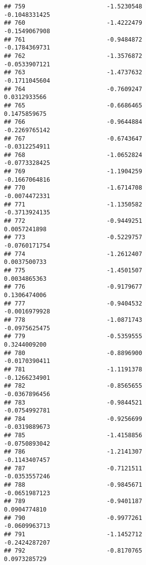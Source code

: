 \documentclass[
]{article}
\begin{document}
\begin{verbatim}
## 759                       -1.5230548                         -0.1048331425
## 760                       -1.4222479                         -0.1549067908
## 761                       -0.9484872                         -0.1784369731
## 762                       -1.3576872                         -0.0533907121
## 763                       -1.4737632                         -0.1711045604
## 764                       -0.7609247                          0.0312933566
## 765                       -0.6686465                          0.1475859675
## 766                       -0.9644884                         -0.2269765142
## 767                       -0.6743647                         -0.0312254911
## 768                       -1.0652824                         -0.0773328425
## 769                       -1.1904259                         -0.1667064816
## 770                       -1.6714708                         -0.0074472331
## 771                       -1.1350582                         -0.3713924135
## 772                       -0.9449251                          0.0057241898
## 773                       -0.5229757                         -0.0760171754
## 774                       -1.2612407                          0.0037500733
## 775                       -1.4501507                          0.0034865363
## 776                       -0.9179677                          0.1306474006
## 777                       -0.9404532                         -0.0016979928
## 778                       -1.0871743                         -0.0975625475
## 779                       -0.5359555                          0.3244009200
## 780                       -0.8896900                         -0.0170390411
## 781                       -1.1191378                         -0.1266234901
## 782                       -0.8565655                         -0.0367896456
## 783                       -0.9844521                         -0.0754992781
## 784                       -0.9256699                         -0.0319889673
## 785                       -1.4158856                         -0.0750893042
## 786                       -1.2141307                         -0.1143407457
## 787                       -0.7121511                         -0.0353557246
## 788                       -0.9845671                         -0.0651987123
## 789                       -0.9401187                          0.0904774810
## 790                       -0.9977261                         -0.0609963713
## 791                       -1.1452712                         -0.2424287207
## 792                       -0.8170765                          0.0973285729

\end{verbatim}
\end{document}
